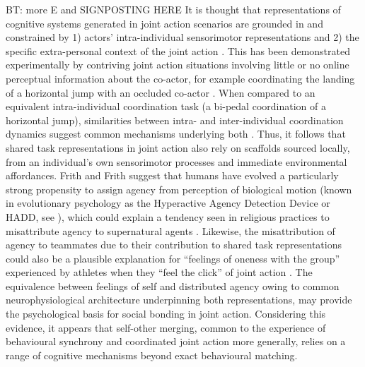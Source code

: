 \begin{CJK}{UTF8}{gbsn}
BT: more E and SIGNPOSTING HERE
It is thought that representations of cognitive systems generated in joint action scenarios are grounded in and constrained by 1) actors' intra-individual sensorimotor representations and 2) the specific extra-personal context of the joint action \citep{Sebanz2006}.  This has been demonstrated experimentally by contriving joint action situations involving little or no online perceptual information about the co-actor, for example coordinating the landing of a horizontal jump with an occluded co-actor \citep{Vesper2012}. When compared to an equivalent intra-individual coordination task (a bi-pedal coordination of a horizontal jump), similarities between intra- and inter-individual coordination dynamics suggest common mechanisms underlying both \citep{Schmidt2008}.  Thus, it follows that shared task representations in joint action also rely on scaffolds sourced locally, from an individual's own sensorimotor processes and immediate environmental affordances\citep{Williams2009}.
Frith and Frith \textcite{Frith2010} suggest that humans have evolved a particularly strong propensity to assign agency from perception of biological motion (known in evolutionary psychology as the Hyperactive Agency Detection Device or HADD, see \cite{Barrett2000,Barrett2007}), which could explain a tendency seen in religious practices to misattribute agency to supernatural agents \citep{Atran2010}.  Likewise, the misattribution of agency to teammates due to their contribution to shared task representations could also be a plausible explanation for ``feelings of oneness with the group'' experienced by athletes when they ``feel the click'' of joint action \citep{Swann2009}. The equivalence between feelings of self and distributed agency owing to common neurophysiological architecture underpinning both representations, may provide the psychological basis for social bonding in joint action.  Considering this evidence, it appears that self-other merging, common to the experience of behavioural synchrony and coordinated joint action more generally, relies on a range of cognitive mechanisms beyond exact behavioural matching.


\end{CJK}
